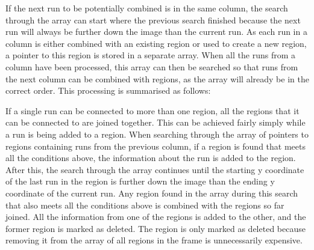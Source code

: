 \documentclass[pdftex,11pt,a4paper]{report}
\begin{document}
If the next run to be potentially combined is in the same column, the search through the array can start where the previous search finished because the next run will always be further down the image than the current run. As each run in a column is either combined with an existing region or used to create a new region, a pointer to this region is stored in a separate array. When all the runs from a column have been processed, this array can then be searched so that runs from the next column can be combined with regions, as the array will already be in the correct order. This processing is summarised as follows:

\begin{algorithmic}
    \ENDIF
    \ELSE
    \ENDIF
    \ENDIF
    \ELSE
    \ENDIF
    \ENDFOR
    \ENDIF
    \ENDIF
    \ENDFOR
    \ENDFOR
\end{algorithmic}

If a single run can be connected to more than one region, all the regions that it can be connected to are joined together. This can be achieved fairly simply while a run is being added to a region. When searching through the array of pointers to regions containing runs from the previous column, if a region is found that meets all the conditions above, the information about the run is added to the region. After this, the search through the array continues until the starting y coordinate of the last run in the region is further down the image than the ending y coordinate of the current run. Any region found in the array during this search that also meets all the conditions above is combined with the regions so far joined. All the information from one of the regions is added to the other, and the former region is marked as deleted. The region is only marked as deleted because removing it from the array of all regions in the frame is unnecessarily expensive. 
\end{document}
